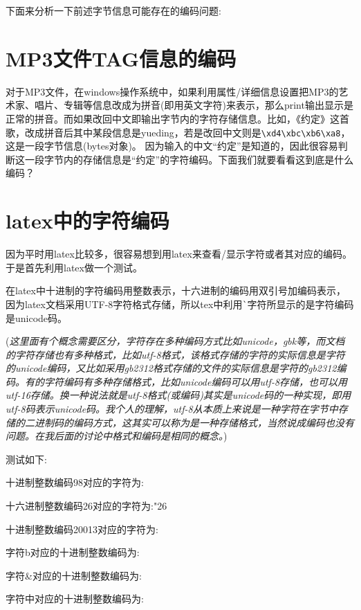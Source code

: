 \documentclass[twoside,11pt]{book}
\begin{document}
下面来分析一下前述字节信息可能存在的编码问题:

\section{MP3文件TAG信息的编码}
对于MP3文件，在windows操作系统中，如果利用属性/详细信息设置把MP3的艺术家、唱片、专辑等信息改成为拼音(即用英文字符)来表示，那么print输出显示是正常的拼音。而如果改回中文即输出字节内的字符存储信息。比如，《约定》这首歌，改成拼音后其中某段信息是yueding，若是改回中文则是\lstinline!\xd4\xbc\xb6\xa8!，这是一段字节信息(bytes对象)。
因为输入的中文“约定”是知道的，因此很容易判断这一段字节内的存储信息是“约定”的字符编码。下面我们就要看看这到底是什么编码？

\section{latex中的字符编码}
因为平时用latex比较多，很容易想到用latex来查看/显示字符或者其对应的编码。于是首先利用latex做一个测试。

在latex中十进制的字符编码用整数表示，十六进制的编码用双引号加编码表示，因为latex文档采用UTF-8字符格式存储，所以tex中利用\verb|`|字符所显示的是字符编码是unicode码。

(\emph{这里面有个概念需要区分，字符存在多种编码方式比如unicode，gbk等，而文档的字符存储也有多种格式，比如utf-8格式，该格式存储的字符的实际信息是字符的unicode编码，又比如采用gb2312格式存储的文件的实际信息是字符的gb2312编码。有的字符编码有多种存储格式，比如unicode编码可以用utf-8存储，也可以用utf-16存储。换一种说法就是utf-8格式(或编码)其实是unicode码的一种实现，即用utf-8码表示unicode码。我个人的理解，utf-8从本质上来说是一种字符在字节中存储的二进制码的编码方式，这其实可以称为是一种存储格式，当然说成编码也没有问题。在我后面的讨论中格式和编码是相同的概念。})

测试如下:

十进制整数编码98对应的字符为:

十六进制整数编码26对应的字符为:\char"26

十进制整数编码20013对应的字符为:

字符b对应的十进制整数编码为:
\setcounter{charcode}{`b}
\thecharcode

字符\&对应的十进制整数编码为:
\setcounter{charcode}{`\&}
\thecharcode

字符中对应的十进制整数编码为:
\setcounter{charcode}{`中}
\thecharcode
\end{document}

